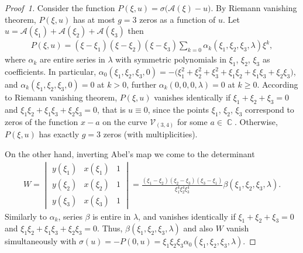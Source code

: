 \documentclass[pdftex]{sigma}
\numberwithin{equation}{section}
\DeclareMathOperator{\Complex}{\mathbb{C}}
\begin{document}
\begin{proof}[Proof~1] Consider the function $P(\xi,u)=\sigma\bigl(\mathcal{A}(\xi)-u\bigr)$. By Riemann vanishing theorem, $P(\xi,u)$ has at most $g=3$ zeros as a function of $u$. Let $u=\mathcal{A}(\xi_1)+\mathcal{A}(\xi_2)+\mathcal{A}(\xi_3)$ then \begin{gather*}
P(\xi,u) = (\xi-\xi_1)(\xi-\xi_2)(\xi-\xi_3)\sum_{k=0} \alpha_k (\xi_1,\xi_2,\xi_3,\lambda)\xi^k,
\end{gather*}
where $\alpha_k$ are entire series in $\lambda$ with symmetric polynomials in $\xi_1$, $\xi_2$, $\xi_3$ as coefficients. In particular, $\alpha_0 (\xi_1,\xi_2,\xi_3,0) = -\big(\xi_1^2+\xi_2^2+\xi_3^2 +\xi_1 \xi_2 + \xi_1 \xi_3 + \xi_2\xi_3\big)$, and $\alpha_k(\xi_1,\xi_2,\xi_3,0)=0$ at $k>0$, further $\alpha_k(0,0,0,\lambda)=0$ at $k\geqslant 0$. According to Riemann vanishing theorem, $P(\xi,u)$ vanishes identically if $\xi_1+\xi_2+\xi_3=0$ and $\xi_1\xi_2+ \xi_1\xi_3 + \xi_2 \xi_3 = 0$, that is $u\equiv 0$, since the points $\xi_1$, $\xi_2$, $\xi_3$ correspond to zeros of the function $x-a$ on the curve $\mathcal{V}_{(3,4)}$ for some $a\in \Complex$. Otherwise, $P(\xi,u)$ has exactly $g=3$ zeros (with multiplicities).

On the other hand, inverting Abel's map we come to the determinant
\begin{gather*}
 W = \begin{vmatrix}
 y(\xi_1) & x(\xi_1) & 1 \\ y(\xi_2) & x(\xi_2) & 1\\ y(\xi_3) & x(\xi_3) & 1
 \end{vmatrix} = \frac{(\xi_1-\xi_2)(\xi_2-\xi_3)(\xi_3-\xi_1)}{\xi_1^4 \xi_2^4 \xi_3^4}
 \beta (\xi_1,\xi_2,\xi_3,\lambda).
\end{gather*}
Similarly to $\alpha_k$, series $\beta$ is entire in $\lambda$, and vanishes identically if $\xi_1+\xi_2+\xi_3=0$ and $\xi_1\xi_2+ \xi_1\xi_3 + \xi_2 \xi_3 = 0$. Thus, $\beta(\xi_1,\xi_2,\xi_3,\lambda)$ and also $W$ vanish simultaneously with $\sigma(u) = - P(0,u)= \xi_1\xi_2\xi_3 \alpha_0(\xi_1,\xi_2,\xi_3,\lambda)$.


\end{proof}
\end{document}
